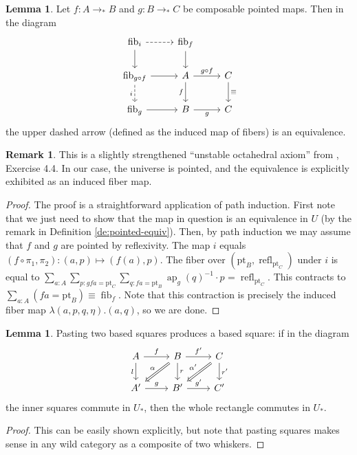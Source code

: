 \documentclass{amsart}
\theoremstyle{definition}
\newtheorem{re}[theorem]{Remark}
\newtheorem{lem}[theorem]{Lemma}
\newcommand{\ap}{\operatorname{ap}}
\newcommand{\refl}{\operatorname{refl}}
\newcommand{\fib}{\operatorname{fib}}
\newcommand{\tot}[2]{\sum\limits_{#1}^{}{#2}}
\newcommand{\bs}[1]{\mathrm{pt}_{#1}}
\newcommand{\pto}{\to_*}
\begin{document}
\begin{lem}\label{le:octahedral}
    Let $f: A \pto B$ and $g: B \pto C$ be composable pointed maps. Then in the diagram
    \[\begin{tikzcd}
    	{\fib_{i}} & {\fib_f} \\
    	{\fib_{g \circ f}} & A & C \\
    	{\fib_g} & B & C
    	\arrow[dashed, from=1-1, to=1-2]
    	\arrow[from=1-1, to=2-1]
    	\arrow[from=1-2, to=2-2]
    	\arrow[from=2-1, to=2-2]
    	\arrow["i"', dashed, from=2-1, to=3-1]
    	\arrow["{g \circ f}", from=2-2, to=2-3]
    	\arrow["f"', from=2-2, to=3-2]
    	\arrow["\equiv", from=2-3, to=3-3]
    	\arrow[from=3-1, to=3-2]
    	\arrow["g"', from=3-2, to=3-3]
    \end{tikzcd}\]
    the upper dashed arrow (defined as the induced map of fibers) is an equivalence.
\end{lem}
\begin{re}
    This is a slightly strengthened ``unstable octahedral axiom'' from \cite{UF}, Exercise 4.4. In our case, the universe is pointed, and the equivalence is explicitly exhibited as an induced fiber map.
\end{re}
\begin{proof}
    The proof is a straightforward application of path induction. First note that we just need to show that the map in question is an equivalence in $U$ (by the remark in Definition \ref{de:pointed-equiv}). Then, by path induction we may assume that $f$ and $g$ are pointed by reflexivity. The map $i$ equals $(f \circ \pi_1, \pi_2): (a,p) \mapsto (f(a), p).$
    The fiber over $(\bs{B}, \refl_{\bs{C}})$ under $i$ is equal to
    $\tot{a:A}{\tot{p:gfa=\bs{C}}{\tot{q:fa=\bs{B}}{\ap_g(q)^{-1} \cdot p^{}=\refl_{\bs{C}}}}}$. This contracts to $\tot{a:A}{(fa=\bs{B})} \equiv \fib_f$. Note that this contraction is precisely the induced fiber map $\lambda (a,p,q,\eta).(a,q)$, so we are done.
\end{proof}


\begin{lem}\label{pasting_of_based}
    Pasting two based squares produces a based square: if in the diagram
\[\begin{tikzcd}
	A & B & C \\
	{A'} & {B'} & {C'}
	\arrow["f", from=1-1, to=1-2]
	\arrow["l"', from=1-1, to=2-1]
	\arrow["{f'}", from=1-2, to=1-3]
	\arrow["\alpha"', Rightarrow, from=1-2, to=2-1]
	\arrow["r", from=1-2, to=2-2]
	\arrow["{\alpha'}"', Rightarrow, from=1-3, to=2-2]
	\arrow["{r'}", from=1-3, to=2-3]
	\arrow["g", from=2-1, to=2-2]
	\arrow["{g'}", from=2-2, to=2-3]
\end{tikzcd}\]
the inner squares commute in $U_*$, then the whole rectangle commutes in $U_*$.
\end{lem}
\begin{proof}
    This can be easily shown explicitly, but note that pasting squares makes sense in any wild category as a composite of two whiskers.
\end{proof}
\end{document}
